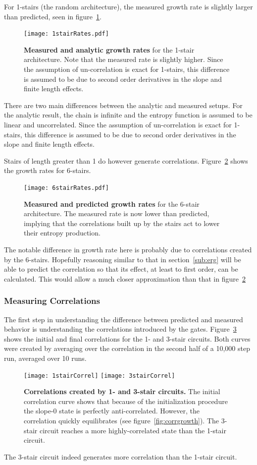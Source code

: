 For 1-stairs (the random architecture), the measured growth rate is slightly larger than predicted, seen in figure~\ref{fig:1stairRates}.
\begin{figure}
	\centering
	\texttt{[image: 1stairRates.pdf]}
	\caption{\textbf{Measured and analytic growth rates} for the 1-stair architecture. Note that the measured rate is slightly higher. Since the assumption of un-correlation is exact for 1-stairs, this difference is assumed to be due to second order derivatives in the slope and finite length effects.}
	\label{fig:1stairRates}
\end{figure}
There are two main differences between the analytic and measured setups. For the analytic result, the chain is infinite and the entropy function is assumed to be linear and uncorrelated. Since the assumption of un-correlation is exact for 1-stairs, this difference is assumed to be due to second order derivatives in the slope and finite length effects.

Stairs of length greater than 1 do however generate correlations. Figure~\ref{fig:6stairRates} shows the growth rates for 6-stairs. 
\begin{figure}
	\centering
	\texttt{[image: 6stairRates.pdf]}
	\caption{\textbf{Measured and predicted growth rates} for the 6-stair architecture. The measured rate is now lower than predicted, implying that the correlations built up by the stairs act to lower their entropy production.}
	\label{fig:6stairRates}
\end{figure}
The notable difference in growth rate here is probably due to correlations created by the 6-stairs. Hopefully reasoning similar to that in section~\ref{sub:erg} will be able to predict the correlation so that its effect, at least to first order, can be calculated. This would allow a much closer approximation than that in figure~\ref{fig:6stairRates}

\subsubsection{Measuring Correlations}  \label{subsub:correlations}

The first step in understanding the difference between predicted and measured behavior is understanding the correlations introduced by the gates. Figure~\ref{fig:stairCorrel} shows the initial and final correlations for the 1- and 3-stair circuits. Both curves were created by averaging over the correlation in the second half of a 10,000 step run, averaged over 10 runs.
\begin{figure}
	\centering
	\texttt{[image: 1stairCorrel]}
	\texttt{[image: 3stairCorrel]}
	\caption{\textbf{Correlations created by 1- and 3-stair circuits.} The initial correlation curve shows that because of the initialization procedure the slope-0 state is perfectly anti-correlated. However, the correlation quickly equilibrates (see figure~\ref{fig:corrgrowth}). The 3-stair circuit reaches a more highly-correlated state than the 1-stair circuit.}
	\label{fig:stairCorrel}
\end{figure}
The 3-stair circuit indeed generates more correlation than the 1-stair circuit. 

